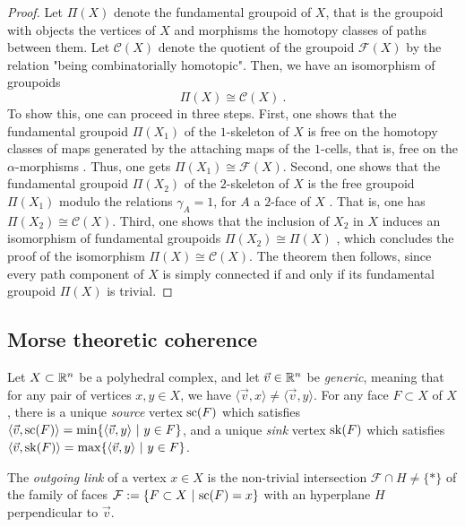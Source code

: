 \begin{proof}
    Let $\Pi(X)$ denote the fundamental groupoid of $X$, that is the groupoid with objects the vertices of $X$ and morphisms the homotopy classes of paths between them.
    Let $\mathcal{C}(X)$ denote the quotient of the groupoid $\mathcal{F}(X)$ by the relation "being combinatorially homotopic". 
    Then, we have an isomorphism of groupoids \[ \Pi(X) \cong \mathcal{C}(X) \ . \]
    To show this, one can proceed in three steps. 
    First, one shows that the fundamental groupoid $\Pi(X_1)$ of the $1$-skeleton of $X$ is free on the homotopy classes of maps generated by the attaching maps of the $1$-cells, that is, free on the $\alpha$-morphisms \cite[9.1.5]{Brown2006}.
    Thus, one gets $\Pi(X_1) \cong \mathcal{F}(X)$. 
    Second, one shows that the fundamental groupoid $\Pi(X_2)$ of the $2$-skeleton of $X$ is the free groupoid $\Pi(X_1)$ modulo the relations $\gamma_A=1$, for $A$ a $2$-face of $X$ \cite[9.1.6]{Brown2006}. 
    That is, one has $\Pi(X_2) \cong \mathcal{C}(X)$.
    Third, one shows that the inclusion of $X_2$ in $X$ induces an isomorphism of fundamental groupoids $\Pi(X_2) \cong \Pi(X)$ \cite[9.1.7]{Brown2006}, which concludes the proof of the isomorphism $\Pi(X) \cong \mathcal{C}(X)$.
    The theorem then follows, since every path component of $X$ is simply connected if and only if its fundamental groupoid $\Pi(X)$ is trivial.  
\end{proof}

\subsection{Morse theoretic coherence}

Let $X\subset \mathbb R^n$ be a polyhedral complex, and let $\vec v \in \mathbb R^n$ be \emph{generic}, meaning that for any pair of vertices $x,y \in X$, we have $\langle \vec v , x \rangle \neq \langle \vec v, y\rangle$.  
For any face $F \subset X$ of $X$, there is a unique \emph{source} vertex $\mathrm{sc}(F)$ which satisfies $\langle \vec v , \mathrm{sc}(F) \rangle = \min \{\langle \vec v , y \rangle \ | \ y \in F \}$, and a unique \emph{sink} vertex $\mathrm{sk}(F)$ which satisfies $\langle \vec v , \mathrm{sk}(F) \rangle = \max \{\langle \vec v , y \rangle \ | \ y \in F \}$.

\begin{definition}
    The \emph{outgoing link} of a vertex $x \in X$ is the non-trivial intersection $\mathcal{F} \cap H \neq \{*\}$ of the family of faces $\mathcal{F}:=\{ F \subset X \ | \ \mathrm{sc}(F)=x \}$ with an hyperplane $H$ perpendicular to $\vec v$.
\end{definition}

